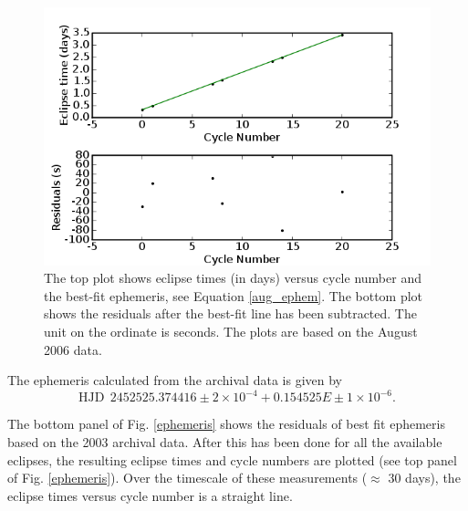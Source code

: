 \begin{figure}
\begin{center}
\includegraphics[width=0.80\columnwidth,bb=0 0 600 400]{images/ephem_plot_aug_data.png}
\caption[Plot of Eclipse times versus cycle number of August 2006 data]{The top plot shows eclipse times (in days) versus cycle number and the best-fit ephemeris, see Equation \ref{aug_ephem}. The bottom plot shows the residuals after the best-fit line has been subtracted. The unit on the ordinate is seconds. The plots are based on the August 2006 data.}
\label{ephemeris_aug}
\end{center}
\end{figure}



The ephemeris calculated from the archival data is given by
\begin{equation}
	\textrm{HJD}\:\: 2452525.374416 \pm 2 \times 10^{-4} + 0.154525E \pm  1\times 10^{-6}.
\label{archive_ephem}
\end{equation}

The bottom panel of Fig. \ref{ephemeris} shows the residuals of best fit ephemeris based on the 2003 archival data.  After this has been done for all the available eclipses, the resulting eclipse times and cycle numbers are plotted (see top panel of Fig. \ref{ephemeris}). Over the timescale of these measurements ($\approx$ 30 days), the eclipse times versus cycle number is a straight line.

